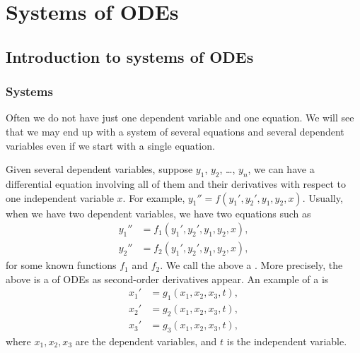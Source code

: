\chapter{Systems of ODEs} \label{sys:chapter}


\section{Introduction to systems of ODEs} \label{sec:introtosys}



\subsection{Systems}

Often we do not have just one dependent variable and one equation.
We will see that we may end up with a system of several
equations and several dependent variables even if we start with
a single equation.

Given several dependent variables,
suppose $y_1$, $y_2$, \ldots, $y_n$,
we can have a differential equation involving all of them and their
derivatives with respect to one independent variable $x$.
For example, $y_1'' = f(y_1',y_2',y_1,y_2,x)$.
Usually, when we have two dependent variables, we have two equations
such as
\begin{equation*}
\begin{aligned}
y_1'' & = f_1(y_1',y_2',y_1,y_2,x) , \\
y_2'' & = f_2(y_1',y_2',y_1,y_2,x) ,
\end{aligned}
\end{equation*}
for some known functions $f_1$ and $f_2$.  We call the above a
\emph{}.
More precisely, the above is a \emph{}
of ODEs as second-order derivatives appear.
An example of a \emph{} is
\begin{equation*}
\begin{aligned}
x_1' & = g_1(x_1,x_2,x_3,t) , \\
x_2' & = g_2(x_1,x_2,x_3,t) , \\
x_3' & = g_3(x_1,x_2,x_3,t) ,
\end{aligned}
\end{equation*}
where $x_1,x_2,x_3$ are
the dependent variables,
and $t$ is the independent variable.

